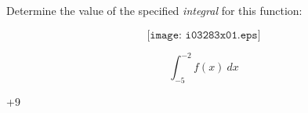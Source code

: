 

Determine the value of the specified {\it integral} for this function:

$$\texttt{[image: i03283x01.eps]}$$

$$\int_{-5}^{-2} f(x) \> dx$$







+9












